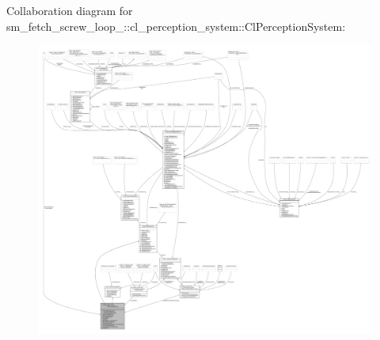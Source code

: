 Collaboration diagram for sm\+\_\+fetch\+\_\+screw\+\_\+loop\+\_\+:\+:cl\+\_\+perception\+\_\+system\+:\+:Cl\+Perception\+System\+:
\nopagebreak
\begin{figure}[H]
\begin{center}
\leavevmode
\includegraphics[width=350pt]{classsm__fetch__screw__loop__1_1_1cl__perception__system_1_1ClPerceptionSystem__coll__graph}
\end{center}
\end{figure}
